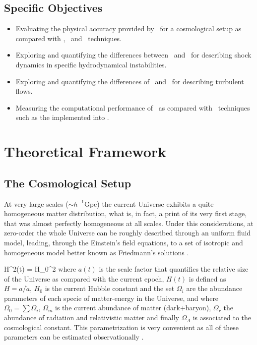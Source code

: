 \documentclass[a4,useAMS,usenatbib,usegraphicx,12pt]{article}
\begin{document}
\subsection*{Specific Objectives}
\begin{itemize}
\item Evaluating the physical accuracy provided by \VPH\ for a cosmological 
setup as compared with \SPH, \AMR\ and \IMM\ techniques.
\item Exploring and quantifying the differences between \VPH\ and \AMR\ for 
describing shock dynamics in specific hydrodynamical instabilities.
\item Exploring and quantifying the differences of \VPH\ and \SPH\ for 
describing turbulent flows.
\item Measuring the computational performance of \VPH\ as compared with \IMM\ 
techniques such as the implemented into \AREPO.
\end{itemize}


\section{Theoretical Framework}
\subsection*{The Cosmological Setup}
At very large scales ($\sim h^{-1}$Gpc) the current Universe exhibits a quite
homogeneous matter distribution, what is, in fact, a print of its very first 
stage, that was almost perfectly homogeneous at all scales. Under this 
considerations, at zero-order the whole Universe can be roughly described 
through an uniform fluid model, leading, through the Einstein's field equations,
to a set of isotropic and homogeneous model better known as Friedmann's 
solutions \citep{longair2008}.

{ H^2(t) = H_0^2\corc{ (1-\Omega_0)\frac{1}{a^2} + \Omega_m\frac{1}{a^3} + 
\Omega_r\frac{1}{a^4} + \Omega_\Lambda } }
where $a(t)$ is the scale factor that quantifies the relative size of the 
Universe as compared with the current epoch, $H(t)$ is defined as $H = a/
\dot a$, $H_0$ is the current Hubble constant and the set $\Omega_i$ are the
abundance parameters of each specie of matter-energy in the Universe, and where 
$\Omega_0 = \sum \Omega_i$, $\Omega_m$ is the current abundance of matter 
(dark+baryon), $\Omega_r$ the abundance of radiation and relativistic matter 
and finally $\Omega_\Lambda$ is associated to the cosmological constant. This
parametrization is very convenient as all of these parameters can be estimated
observationally \citep{Planck13XVI}.
\end{document}
